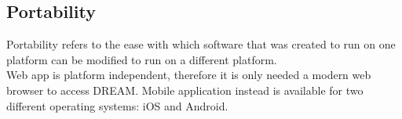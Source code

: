 \subsection{Portability}

Portability refers to the ease with which software that was created to run on one platform can be modified to run on a different platform.\\
Web app is platform independent, therefore it is only needed a modern web browser to access DREAM.
Mobile application instead is available for two different operating systems: iOS and Android.